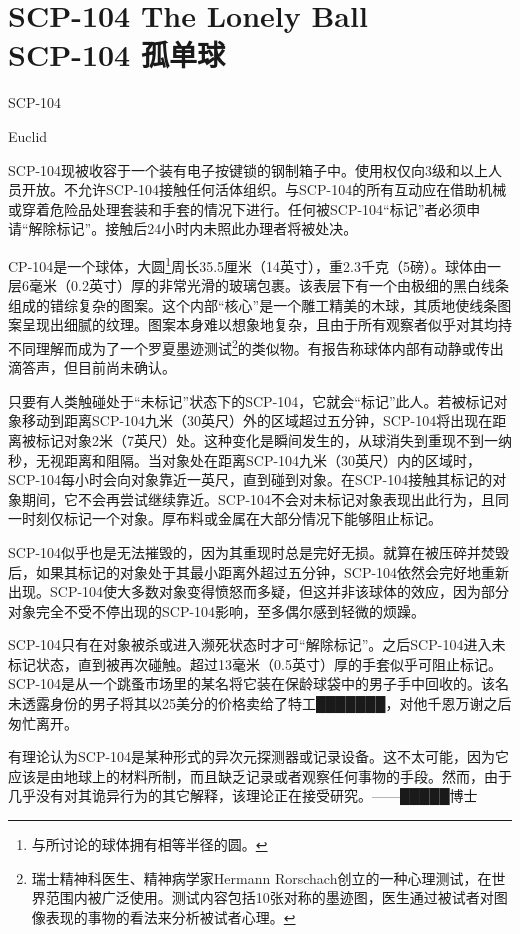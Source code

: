 \chapter[SCP-104 孤单球]{
    SCP-104 The Lonely Ball\\
    SCP-104 孤单球
}

\label{chap:SCP-104}

SCP-104

Euclid

SCP-104现被收容于一个装有电子按键锁的钢制箱子中。使用权仅向3级和以上人员开放。不允许SCP-104接触任何活体组织。与SCP-104的所有互动应在借助机械或穿着危险品处理套装和手套的情况下进行。任何被SCP-104“标记”者必须申请“解除标记”。接触后24小时内未照此办理者将被处决。

CP-104是一个球体，大圆\footnote{与所讨论的球体拥有相等半径的圆。}周长35.5厘米（14英寸），重2.3千克（5磅）。球体由一层6毫米（0.2英寸）厚的非常光滑的玻璃包裹。该表层下有一个由极细的黑白线条组成的错综复杂的图案。这个内部“核心”是一个雕工精美的木球，其质地使线条图案呈现出细腻的纹理。图案本身难以想象地复杂，且由于所有观察者似乎对其均持不同理解而成为了一个罗夏墨迹测试\footnote{瑞士精神科医生、精神病学家Hermann Rorschach创立的一种心理测试，在世界范围内被广泛使用。测试内容包括10张对称的墨迹图，医生通过被试者对图像表现的事物的看法来分析被试者心理。}的类似物。有报告称球体内部有动静或传出滴答声，但目前尚未确认。

只要有人类触碰处于“未标记”状态下的SCP-104，它就会“标记”此人。若被标记对象移动到距离SCP-104九米（30英尺）外的区域超过五分钟，SCP-104将出现在距离被标记对象2米（7英尺）处。这种变化是瞬间发生的，从球消失到重现不到一纳秒，无视距离和阻隔。当对象处在距离SCP-104九米（30英尺）内的区域时，SCP-104每小时会向对象靠近一英尺，直到碰到对象。在SCP-104接触其标记的对象期间，它不会再尝试继续靠近。SCP-104不会对未标记对象表现出此行为，且同一时刻仅标记一个对象。厚布料或金属在大部分情况下能够阻止标记。

SCP-104似乎也是无法摧毁的，因为其重现时总是完好无损。就算在被压碎并焚毁后，如果其标记的对象处于其最小距离外超过五分钟，SCP-104依然会完好地重新出现。SCP-104使大多数对象变得愤怒而多疑，但这并非该球体的效应，因为部分对象完全不受不停出现的SCP-104影响，至多偶尔感到轻微的烦躁。

SCP-104只有在对象被杀或进入濒死状态时才可“解除标记”。之后SCP-104进入未标记状态，直到被再次碰触。超过13毫米（0.5英寸）厚的手套似乎可阻止标记。SCP-104是从一个跳蚤市场里的某名将它装在保龄球袋中的男子手中回收的。该名未透露身份的男子将其以25美分的价格卖给了特工███████，对他千恩万谢之后匆忙离开。

\hr


有理论认为SCP-104是某种形式的异次元探测器或记录设备。这不太可能，因为它应该是由地球上的材料所制，而且缺乏记录或者观察任何事物的手段。然而，由于几乎没有对其诡异行为的其它解释，该理论正在接受研究。——█████博士
